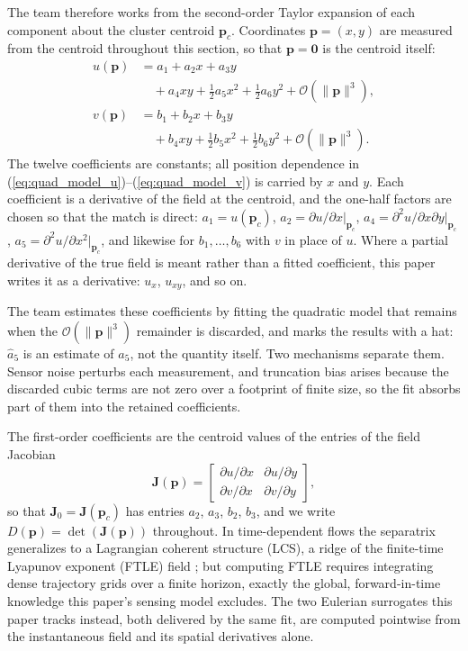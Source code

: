 \documentclass[lettersize,journal]{IEEEtran}
\begin{document}
The team therefore works from the second-order Taylor expansion of each
component about the cluster centroid $\mathbf{p}_c$. Coordinates
$\mathbf{p} = (x, y)$ are measured from the centroid throughout this
section, so that $\mathbf{p} = \mathbf{0}$ is the centroid itself:
\begin{align}
    u(\mathbf{p}) &= a_1 + a_2 x + a_3 y
        \nonumber \\
        &\quad + a_4 xy + \tfrac{1}{2} a_5 x^2 + \tfrac{1}{2} a_6 y^2
        + \mathcal{O}(\|\mathbf{p}\|^3),
        \label{eq:quad_model_u} \\
    v(\mathbf{p}) &= b_1 + b_2 x + b_3 y
        \nonumber \\
        &\quad + b_4 xy + \tfrac{1}{2} b_5 x^2 + \tfrac{1}{2} b_6 y^2
        + \mathcal{O}(\|\mathbf{p}\|^3).
        \label{eq:quad_model_v}
\end{align}
The twelve coefficients are constants; all position dependence in
(\ref{eq:quad_model_u})--(\ref{eq:quad_model_v}) is carried by $x$ and
$y$. Each coefficient is a derivative of the field at the centroid, and
the one-half factors are chosen so that the match is direct:
$a_1 = u(\mathbf{p}_c)$, $a_2 = \partial u/\partial x|_{\mathbf{p}_c}$,
$a_4 = \partial^2 u/\partial x \partial y|_{\mathbf{p}_c}$,
$a_5 = \partial^2 u/\partial x^2|_{\mathbf{p}_c}$, and likewise for
$b_1, \ldots, b_6$ with $v$ in place of $u$. Where a partial derivative
of the true field is meant rather than a fitted coefficient, this paper
writes it as a derivative: $u_x$, $u_{xy}$, and so on.

The team estimates these coefficients by fitting the quadratic model that
remains when the $\mathcal{O}(\|\mathbf{p}\|^3)$ remainder is discarded,
and marks the results with a hat: $\hat{a}_5$ is an estimate of $a_5$,
not the quantity itself. Two mechanisms separate them. Sensor
noise perturbs each measurement, and truncation bias arises because the
discarded cubic terms are not zero over a footprint of finite size, so the
fit absorbs part of them into the retained coefficients.

The first-order coefficients are the centroid values of the entries of the
field Jacobian
\begin{equation}
    \mathbf{J}(\mathbf{p}) =
    \begin{bmatrix}
        \partial u / \partial x & \partial u / \partial y \\
        \partial v / \partial x & \partial v / \partial y
    \end{bmatrix},
    \label{eq:jacobian}
\end{equation}
so that $\mathbf{J}_0 = \mathbf{J}(\mathbf{p}_c)$ has entries $a_2$,
$a_3$, $b_2$, $b_3$, and we write $D(\mathbf{p}) =
\det(\mathbf{J}(\mathbf{p}))$ throughout. In time-dependent flows the
separatrix generalizes to a Lagrangian coherent structure (LCS), a ridge
of the finite-time Lyapunov exponent (FTLE) field \cite{6,7,8}; but
computing FTLE requires integrating dense trajectory grids over a
finite horizon, exactly the global, forward-in-time knowledge this
paper's sensing model excludes. The two Eulerian surrogates this paper
tracks instead, both delivered by the same fit, are computed pointwise
from the instantaneous field and its spatial derivatives alone.
\end{document}

